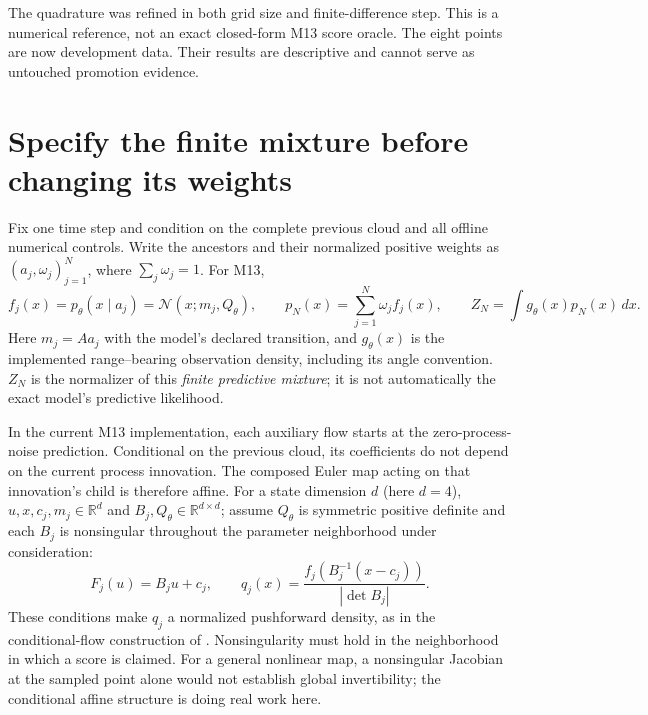 \documentclass[11pt]{article}
\newcommand{\N}{\mathcal N}
\begin{document}
The quadrature was refined in both grid size and finite-difference step.
This is a numerical reference, not an exact closed-form M13 score oracle.
The eight points are now development data. Their results are descriptive
and cannot serve as untouched promotion evidence.

\section{Specify the finite mixture before changing its weights}

Fix one time step and condition on the complete previous cloud and all
offline numerical controls. Write the ancestors and their normalized
positive weights as $(a_j,\omega_j)_{j=1}^N$, where
$\sum_j\omega_j=1$. For M13,
\begin{equation}
 f_j(x)=p_\theta(x\mid a_j)=\N(x;m_j,Q_\theta),\qquad
 p_N(x)=\sum_{j=1}^N\omega_j f_j(x),\qquad
 Z_N=\int g_\theta(x)p_N(x)\,dx .
 \label{eq:predictive-mixture}
\end{equation}
Here $m_j=Aa_j$ with the model's declared transition, and $g_\theta(x)$ is
the implemented range--bearing observation density, including its angle
convention. $Z_N$ is the normalizer of this \emph{finite predictive
mixture}; it is not automatically the exact model's predictive likelihood.

In the current M13 implementation, each auxiliary flow starts at the
zero-process-noise prediction. Conditional on the previous cloud, its
coefficients do not depend on the current process innovation. The composed
Euler map acting on that innovation's child is therefore affine. For a
state dimension $d$ (here $d=4$), $u,x,c_j,m_j\in\mathbb R^d$ and
$B_j,Q_\theta\in\mathbb R^{d\times d}$; assume $Q_\theta$ is symmetric
positive definite and each $B_j$ is nonsingular throughout the
parameter neighborhood under consideration:
\begin{equation}
 F_j(u)=B_j u+c_j,\qquad
 q_j(x)=\frac{f_j\!\left(B_j^{-1}(x-c_j)\right)}
                   {|\det B_j|}.
 \label{eq:affine-density}
\end{equation}
These conditions make $q_j$ a normalized pushforward density, as in the
conditional-flow construction of \cite[Algorithm~1 and Eqs.~(19)--(20)]{li}.
Nonsingularity must hold in the neighborhood in which a score is claimed.
For a general nonlinear map, a nonsingular Jacobian at the sampled point
alone would not establish global invertibility; the conditional affine
structure is doing real work here.
\end{document}
